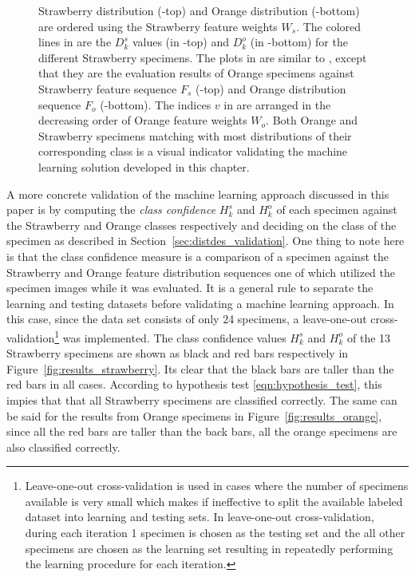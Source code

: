 \documentclass {udthesis}
\begin{document}
\begin{figure}
{Strawberry distribution (-top) and Orange distribution (-bottom) are ordered using the Strawberry feature weights $W_s$. The colored lines in  are the $D^s_k$ values (in -top) and $D^o_k$ (in -bottom) for the different Strawberry specimens. 
The plots in  are similar to , except that they are the evaluation results of Orange specimens against Strawberry feature sequence $F_s$ (-top) and Orange distribution sequence $F_o$ (-bottom). The indices $v$ in  are arranged in the decreasing order of Orange feature weights $W_o$. Both Orange and Strawberry specimens matching with most distributions of their corresponding class is a visual indicator validating the machine learning solution developed in this chapter.}
\label{fig:feat_results}
\end{figure}	
%

A more concrete validation of the machine learning approach discussed in this paper is by computing the \emph{class confidence} $H^s_k$ and $H^o_k$ of each specimen against the Strawberry and Orange classes respectively and deciding on the class of the specimen as described in Section~\ref{sec:distdes_validation}. One thing to note here is that the class confidence measure is a comparison of a specimen against the Strawberry and Orange feature distribution sequences one of which utilized the specimen images while it was evaluated. It is a general rule to separate the learning and testing datasets before validating a machine learning approach. In this case, since the data set consists of only 24 specimens, a leave-one-out cross-validation\footnote{Leave-one-out cross-validation is used in cases where the number of specimens available is very small which makes if ineffective to split the available labeled dataset into learning and testing sets. In leave-one-out cross-validation, during each iteration 1 
specimen is chosen as the testing set and the all other specimens are chosen as the learning set resulting in repeatedly performing the learning procedure for each iteration.} \cite{alpaydin} was implemented. The class confidence values $H^s_k$ and $H^o_k$ of the 13 Strawberry specimens are shown as black and red bars respectively in Figure~\ref{fig:results_strawberry}. Its clear that the black bars are taller than the red bars in all cases. According to hypothesis test \eqref{eqn:hypothesis_test}, this impies that that all Strawberry specimens are classified correctly. The same can be said for the results from Orange specimens in Figure~\ref{fig:results_orange}, since all the red bars are taller than the back bars, all the orange specimens are also classified correctly.
\end{document}
